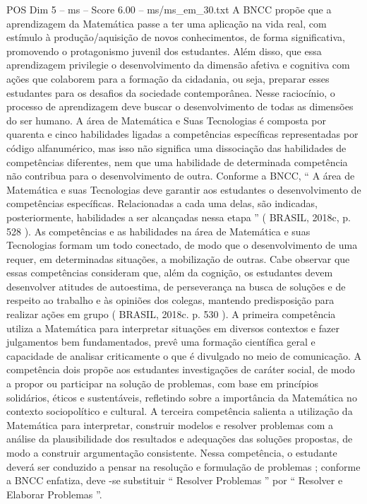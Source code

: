 \begin{textsample}{POS Dim 5 – ms – Score 6.00 – ms/ms\_em\_30.txt}
A BNCC propõe que a aprendizagem da Matemática passe a ter uma aplicação na vida real, com estímulo à produção/aquisição de novos conhecimentos, de forma significativa, promovendo o protagonismo juvenil dos estudantes.
Além disso, que essa aprendizagem privilegie o desenvolvimento da dimensão afetiva e cognitiva com ações que colaborem para a formação da cidadania, ou seja, preparar esses estudantes para os desafios da sociedade contemporânea.
Nesse raciocínio, o processo de aprendizagem deve buscar o desenvolvimento de todas as dimensões do ser humano.
A área de Matemática e Suas Tecnologias é composta por quarenta e cinco habilidades ligadas a competências específicas representadas por código alfanumérico, mas isso não significa uma dissociação das habilidades de competências diferentes, nem que uma habilidade de determinada competência não contribua para o desenvolvimento de outra.
Conforme a BNCC, “ A área de Matemática e suas Tecnologias deve garantir aos estudantes o desenvolvimento de competências específicas.
Relacionadas a cada uma delas, são indicadas, posteriormente, habilidades a ser alcançadas nessa etapa ” ( BRASIL, 2018c, p. 528 ).
As competências e as habilidades na área de Matemática e suas Tecnologias formam um todo conectado, de modo que o desenvolvimento de uma requer, em determinadas situações, a mobilização de outras.
Cabe observar que essas competências consideram que, além da cognição, os estudantes devem desenvolver atitudes de autoestima, de perseverança na busca de soluções e de respeito ao trabalho e às opiniões dos colegas, mantendo predisposição para realizar ações em grupo ( BRASIL, 2018c. p. 530 ).
A primeira competência utiliza a Matemática para interpretar situações em diversos contextos e fazer julgamentos bem fundamentados, prevê uma formação científica geral e capacidade de analisar criticamente o que é divulgado no meio de comunicação.
A competência dois propõe aos estudantes investigações de caráter social, de modo a propor ou participar na solução de problemas, com base em princípios solidários, éticos e sustentáveis, refletindo sobre a importância da Matemática no contexto sociopolítico e cultural.
A terceira competência salienta a utilização da Matemática para interpretar, construir modelos e resolver problemas com a análise da plausibilidade dos resultados e adequações das soluções propostas, de modo a construir argumentação consistente.
Nessa competência, o estudante deverá ser conduzido a pensar na resolução e formulação de problemas ; conforme a BNCC enfatiza, deve -se substituir “ Resolver Problemas ” por “ Resolver e Elaborar Problemas ”.

\end{textsample}
